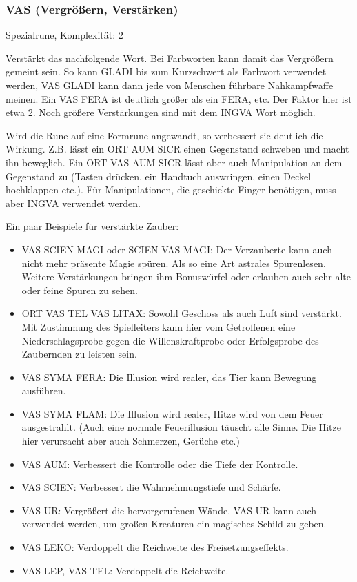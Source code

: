 \documentclass{article}
\begin{document}
\subsubsection{VAS (Vergrößern, Verstärken)}

Spezialrune, Komplexität: 2

Verstärkt das nachfolgende Wort. Bei Farbworten kann damit das Vergrößern gemeint sein. So kann GLADI bis zum
Kurzschwert als Farbwort verwendet werden, VAS GLADI kann dann jede von Menschen führbare Nahkampfwaffe meinen. Ein
VAS FERA ist deutlich größer als ein FERA, etc. Der Faktor hier ist etwa 2. Noch größere Verstärkungen sind mit dem
INGVA Wort möglich.

Wird die Rune auf eine Formrune angewandt, so verbessert sie deutlich die Wirkung. Z.B. lässt ein ORT AUM SICR einen
Gegenstand schweben und macht ihn beweglich. Ein ORT VAS AUM SICR lässt aber auch Manipulation an dem Gegenstand zu
(Tasten drücken, ein Handtuch auswringen, einen Deckel hochklappen etc.). Für Manipulationen, die geschickte Finger
benötigen, muss aber INGVA verwendet werden.

Ein paar Beispiele für verstärkte Zauber:

\begin{itemize}
\item VAS SCIEN MAGI oder SCIEN VAS MAGI: Der Verzauberte kann auch nicht mehr präsente Magie spüren. Als so eine Art astrales Spurenlesen. Weitere Verstärkungen bringen ihm Bonuswürfel oder erlauben auch sehr alte oder feine Spuren zu sehen.
\item ORT VAS TEL VAS LITAX: Sowohl Geschoss als auch Luft sind verstärkt. Mit Zustimmung des Spielleiters kann hier vom Getroffenen eine Niederschlagsprobe gegen die Willenskraftprobe oder Erfolgsprobe des Zaubernden zu leisten sein.
\item VAS SYMA FERA: Die Illusion wird realer, das Tier kann Bewegung ausführen.
\item VAS SYMA FLAM: Die Illusion wird realer, Hitze wird von dem Feuer ausgestrahlt. (Auch eine normale Feuerillusion täuscht alle Sinne. Die Hitze hier verursacht aber auch Schmerzen, Gerüche etc.)
\item VAS AUM: Verbessert die Kontrolle oder die Tiefe der Kontrolle.
\item VAS SCIEN: Verbessert die Wahrnehmungstiefe und Schärfe.
\item VAS UR: Vergrößert die hervorgerufenen Wände. VAS UR kann auch verwendet werden, um großen Kreaturen ein magisches Schild zu geben.
\item VAS LEKO: Verdoppelt die Reichweite des Freisetzungseffekts.
\item VAS LEP, VAS TEL: Verdoppelt die Reichweite.
\end{itemize}
\end{document}
